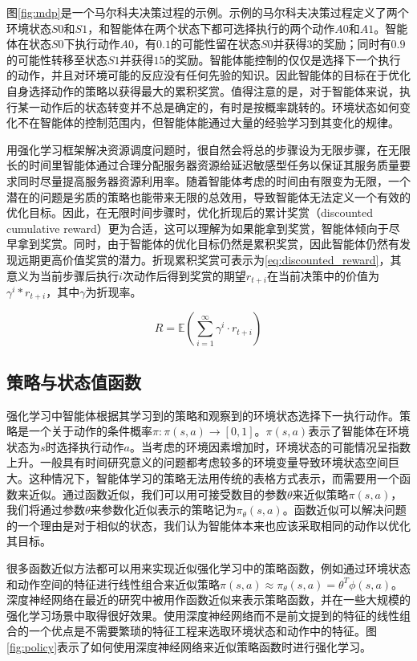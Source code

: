图\ref{fig:mdp}是一个马尔科夫决策过程的示例。示例的马尔科夫决策过程定义了两个环境状态$S0$和$S1$，和智能体在两个状态下都可选择执行的两个动作$A0$和$A1$。智能体在状态$S0$下执行动作$A0$，有$0.1$的可能性留在状态$S0$并获得$3$的奖励；同时有$0.9$的可能性转移至状态$S1$并获得$15$的奖励。智能体能控制的仅仅是选择下一个执行的动作，并且对环境可能的反应没有任何先验的知识。因此智能体的目标在于优化自身选择动作的策略以获得最大的累积奖赏。值得注意的是，对于智能体来说，执行某一动作后的状态转变并不总是确定的，有时是按概率跳转的。环境状态如何变化不在智能体的控制范围内，但智能体能通过大量的经验学习到其变化的规律。

用强化学习框架解决资源调度问题时，很自然会将总的步骤设为无限步骤，在无限长的时间里智能体通过合理分配服务器资源给延迟敏感型任务以保证其服务质量要求同时尽量提高服务器资源利用率。随着智能体考虑的时间由有限变为无限，一个潜在的问题是劣质的策略也能带来无限的总效用，导致智能体无法定义一个有效的优化目标。因此，在无限时间步骤时，优化折现后的累计奖赏（discounted cumulative reward）更为合适，这可以理解为如果能拿到奖赏，智能体倾向于尽早拿到奖赏。同时，由于智能体的优化目标仍然是累积奖赏，因此智能体仍然有发现远期更高价值奖赏的潜力。折现累积奖赏可表示为\ref{eq:discounted_reward}，其意义为当前步骤后执行$i$次动作后得到奖赏的期望$r_{t+i}$在当前决策中的价值为$\gamma^i*r_{t+i}$，其中$\gamma$为折现率。

\begin{equation}
  \label{eq:discounted_reward}
    R = \mathbb{E}(\sum_{i=1}^{\infty} {\gamma^{i}} \cdot r_{t+i})
\end{equation}

\subsection{策略与状态值函数}
强化学习中智能体根据其学习到的策略和观察到的环境状态选择下一执行动作。策略是一个关于动作的条件概率$\pi: \pi(s, a)\rightarrow[0,1]$。$\pi(s, a)$表示了智能体在环境状态为$s$时选择执行动作$a$。当考虑的环境因素增加时，环境状态的可能情况呈指数上升。一般具有时间研究意义的问题都考虑较多的环境变量导致环境状态空间巨大。这种情况下，智能体学习的策略无法用传统的表格方式表示，而需要用一个函数来近似\cite{bertsekas1995dynamic}\cite{menache2005basis}。通过函数近似，我们可以用可接受数目的参数$\theta$来近似策略$\pi(s, a)$，我们将通过参数$\theta$来参数化近似表示的策略记为$\pi_\theta(s,a)$。函数近似可以解决问题的一个理由是对于相似的状态，我们认为智能体本来也应该采取相同的动作以优化其目标。

很多函数近似方法都可以用来实现近似强化学习中的策略函数，例如通过环境状态和动作空间的特征进行线性组合来近似策略$\pi(s,a)\approx\pi_\theta(s,a)=\theta^T\phi(s,a)$。 深度神经网络在最近的研究中被用作函数近似来表示策略函数，并在一些大规模的强化学习场景中取得很好效果。使用深度神经网络而不是前文提到的特征的线性组合的一个优点是不需要繁琐的特征工程来选取环境状态和动作中的特征。图\ref{fig:policy}表示了如何使用深度神经网络来近似策略函数时进行强化学习。

